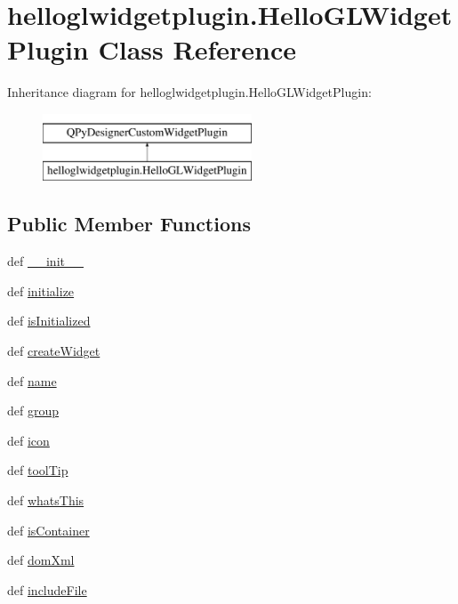 \hypertarget{classhelloglwidgetplugin_1_1HelloGLWidgetPlugin}{}\section{helloglwidgetplugin.\+Hello\+G\+L\+Widget\+Plugin Class Reference}
\label{classhelloglwidgetplugin_1_1HelloGLWidgetPlugin}
Inheritance diagram for helloglwidgetplugin.\+Hello\+G\+L\+Widget\+Plugin\+:\begin{figure}[H]
\begin{center}
\leavevmode
\includegraphics[height=2.000000cm]{classhelloglwidgetplugin_1_1HelloGLWidgetPlugin}
\end{center}
\end{figure}
\subsection*{Public Member Functions}
\begin{DoxyCompactItemize}
\item 
def \hyperlink{classhelloglwidgetplugin_1_1HelloGLWidgetPlugin_a73994e501a85b441c323d9cffc83d837}{\+\_\+\+\_\+init\+\_\+\+\_\+}
\item 
def \hyperlink{classhelloglwidgetplugin_1_1HelloGLWidgetPlugin_af8540b252a1a9bceb3395d869ad37d6d}{initialize}
\item 
def \hyperlink{classhelloglwidgetplugin_1_1HelloGLWidgetPlugin_ab08d5c1048c91171c94f1d79362514ea}{is\+Initialized}
\item 
def \hyperlink{classhelloglwidgetplugin_1_1HelloGLWidgetPlugin_a23e7f1e6b314344875d974965718483a}{create\+Widget}
\item 
def \hyperlink{classhelloglwidgetplugin_1_1HelloGLWidgetPlugin_ac16b3e422d7a61f7483e2838c7559247}{name}
\item 
def \hyperlink{classhelloglwidgetplugin_1_1HelloGLWidgetPlugin_affc6abbce01848ae1b9b6028c4cc0e67}{group}
\item 
def \hyperlink{classhelloglwidgetplugin_1_1HelloGLWidgetPlugin_a907be9120ea0a8d71d4b73f7f56158d7}{icon}
\item 
def \hyperlink{classhelloglwidgetplugin_1_1HelloGLWidgetPlugin_a7d5f6ae8a7346810b5f7136263190f4f}{tool\+Tip}
\item 
def \hyperlink{classhelloglwidgetplugin_1_1HelloGLWidgetPlugin_a751dcb7b326c3e136b058d57060cbbe0}{whats\+This}
\item 
def \hyperlink{classhelloglwidgetplugin_1_1HelloGLWidgetPlugin_a293a1d114f24bab388306b1d740afc5b}{is\+Container}
\item 
def \hyperlink{classhelloglwidgetplugin_1_1HelloGLWidgetPlugin_a2dfa0b7cce451c98d97afbce13412230}{dom\+Xml}
\item 
def \hyperlink{classhelloglwidgetplugin_1_1HelloGLWidgetPlugin_a0d570ce04ec0f84bad786be480f44aba}{include\+File}
\end{DoxyCompactItemize}
